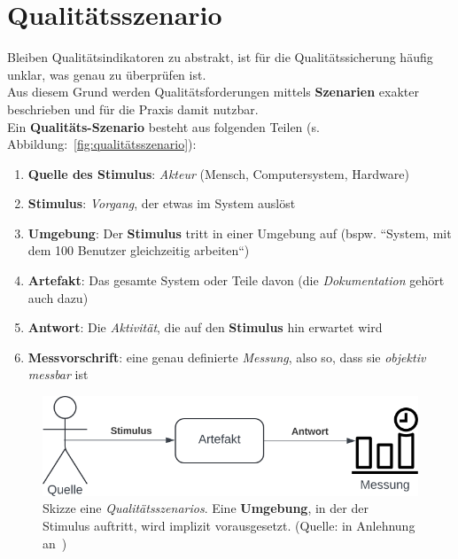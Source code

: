 \section{Qualitätsszenario}

\begin{tcolorbox}[title=Qualitätsszenario]

    Bleiben Qualitätsindikatoren zu abstrakt, ist für die Qualitätssicherung häufig unklar, was genau zu überprüfen ist.\\
    Aus diesem Grund werden Qualitätsforderungen mittels \textbf{Szenarien} exakter beschrieben und für die Praxis damit nutzbar.\\
    Ein \textbf{Qualitäts-Szenario} besteht aus folgenden Teilen (s. Abbildung:~\ref{fig:qualitätsszenario}):

    \begin{enumerate}
        \item \textbf{Quelle des Stimulus}: \textit{Akteur} (Mensch, Computersystem, Hardware)
        \item \textbf{Stimulus}: \textit{Vorgang}, der etwas im System auslöst
        \item \textbf{Umgebung}: Der \textbf{Stimulus} tritt in einer Umgebung auf (bspw. ``System, mit dem 100 Benutzer gleichzeitig arbeiten``)
        \item \textbf{Artefakt}: Das gesamte System oder Teile davon (die \textit{Dokumentation} gehört auch dazu)
        \item \textbf{Antwort}: Die \textit{Aktivität}, die auf den \textbf{Stimulus} hin erwartet wird
        \item \textbf{Messvorschrift}: eine genau definierte \textit{Messung}, also so, dass sie \textit{objektiv messbar} ist
    \end{enumerate}

\end{tcolorbox}

\begin{figure}
    \centering
    \includegraphics[scale=0.4]{part four/Qualität/img/qualitätsszenario}
    \caption{Skizze eine \textit{Qualitätsszenarios}. Eine \textbf{Umgebung}, in der der Stimulus auftritt, wird implizit vorausgesetzt. (Quelle: in Anlehnung an~\cite[Abb. 1.2, 4]{Wed09c})}
    \label{fig:qualitätsszenario-cc}
\end{figure}
